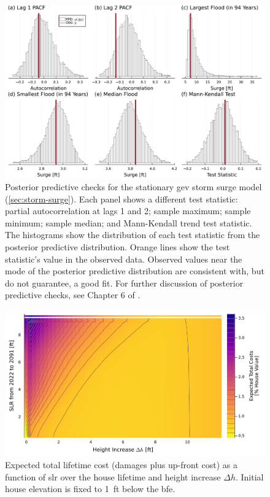 \documentclass[11pt]{article}
\begin{document}
\begin{figure}
    \centering
    \includegraphics[width=\textwidth]{surge-test-statistics}
    \caption{
        Posterior predictive checks for the stationary \gls{gev} storm surge model (\cref{sec:storm-surge}).
        Each panel shows a different test statistic: partial autocorrelation at lags 1 and 2; sample maximum; sample minimum; sample median; and Mann-Kendall trend test statistic.
        The histograms show the distribution of each test statistic from the posterior predictive distribution.
        Orange lines show the test statistic's value in the observed data.
        Observed values near the mode of the posterior predictive distribution are consistent with, but do not guarantee, a good fit.
        For further discussion of posterior predictive checks, see Chapter 6 of \citet{Gelman:2014tc}.
    }\label{fig:surge-test-statistics}
\end{figure}

\begin{figure}
    \includegraphics[width=\textwidth]{scenario-map-height-slr}
    \caption{
        Expected total lifetime cost (damages plus up-front cost) as a function of \gls{slr} over the house lifetime and height increase $\Delta h$.
        Initial house elevation is fixed to \SI{1}{ft} below the \gls{bfe}.
    }\label{fig:scenario-map-height-slr}
\end{figure}
\end{document}
